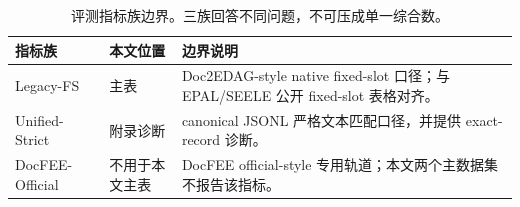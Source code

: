 \begin{table}[htbp]
\centering
\caption{评测指标族边界。三族回答不同问题，不可压成单一综合数。}
\label{tab:metric-families}
\small
\begin{tabular}{>{\raggedright\arraybackslash}p{}>{\raggedright\arraybackslash}p{}>{\raggedright\arraybackslash}p{}}
\toprule
指标族 & 本文位置 & 边界说明 \\
\midrule
Legacy-FS & 主表 & Doc2EDAG-style native fixed-slot 口径；与 EPAL/SEELE 公开 fixed-slot 表格对齐。 \\
Unified-Strict & 附录诊断 & canonical JSONL 严格文本匹配口径，并提供 exact-record 诊断。 \\
DocFEE-Official & 不用于本文主表 & DocFEE official-style 专用轨道；本文两个主数据集不报告该指标。 \\
\bottomrule
\end{tabular}
\end{table}
